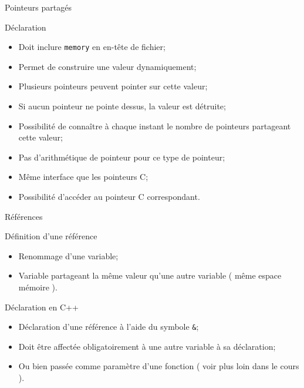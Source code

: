\documentclass[handout,10pt]{beamer}
\newcommand{\includepartcode}[4][cpp]{

}
\begin{document}
\begin{frame}[fragile]{Pointeurs partagés}
\tiny
\begin{block}{Déclaration}
\begin{itemize}
\item Doit inclure \lstinline$memory$ en en-tête de fichier;
\item Permet de construire une valeur dynamiquement;
\item Plusieurs pointeurs peuvent pointer sur cette valeur;
\item Si aucun pointeur ne pointe dessus, la valeur est détruite;
\item Possibilité de connaître à chaque instant le nombre de pointeurs partageant cette valeur;
\item Pas d'arithmétique de pointeur pour ce type de pointeur;
\item Même interface que les pointeurs C;
\item Possibilité d'accéder au pointeur C correspondant.
\end{itemize}
\end{block}
\includepartcode{pointeurs.cpp}{39}{47}
\end{frame}

\begin{frame}[fragile]{Références}
\tiny
\begin{block}{Définition d'une référence}
\begin{itemize}
\item Renommage d'une variable;
\item Variable partageant la même valeur qu'une autre variable ( même espace mémoire ).
\end{itemize}
\end{block}

\begin{block}{Déclaration en C++}
\begin{itemize}
\item Déclaration d'une référence à l'aide du symbole \lstinline$&$;
\item Doit être affectée obligatoirement à une autre variable à sa déclaration;
\item Ou bien passée comme paramètre d'une fonction ( voir plus loin dans le cours ).
\end{itemize}
\end{block}
\includepartcode{references.cpp}{5}{10}
\end{frame}
\end{document}
